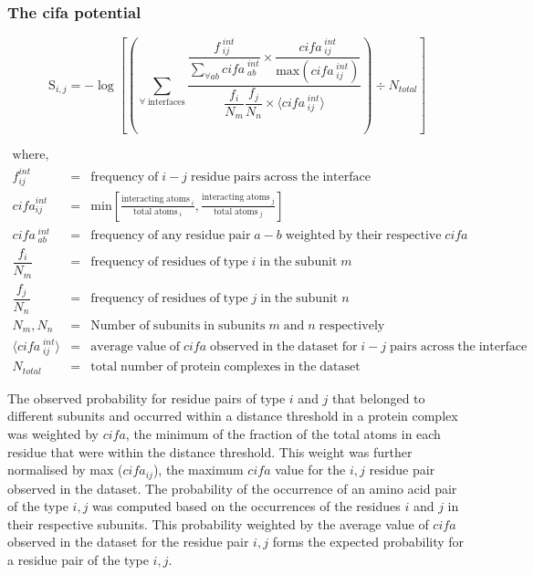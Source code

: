 \subsubsection{The cifa potential} 
\vspace{24pt}
\begingroup
\large
\begin{equation}
\mathrm{S}_{i,j} = -\log \left[ \left(\sum\limits_{\forall \;\mathrm{interfaces}} \dfrac{\dfrac{ f_{\;ij}^{\;int}}{\sum\limits_{\forall ab}{cifa}_{\;ab}^{\;int}} \times \dfrac{{cifa}_{\;ij}^{\;int}}{\mathrm{max}({cifa}_{\;ij}^{\;int})}}{\dfrac{f_i}{N_m}\dfrac{f_j}{N_n} \times \langle {cifa}_{\;ij}^{\;int} \rangle} \right) \div N_{total} \right] 
\end{equation}
\endgroup

\begingroup
\setlength\abovedisplayskip{0pt}
\begin{eqnarray}
\mathrm{where,} \nonumber \\
f_{ij}^{int} &=& \mathrm{frequency\;of}\;i-j\; \mathrm{residue\;pairs\;across\;the\;interface}
\nonumber \\
{cifa}_{ij}^{int} &=& \mathrm{min}\left[ \frac{\mathrm{interacting \; atoms}_{\;i}}{\mathrm{total \; atoms}_{\;i}}, \frac{\mathrm{interacting \; atoms}_{\;j}}{\mathrm{total \; atoms}_{\;j}}\right]
\nonumber \\
cifa_{\;ab}^{\;int} &=& \mathrm{frequency\;of\;any\;residue\;pair}\;a-b\; \mathrm{weighted\;by\;their\;respective\;}cifa
\nonumber \\
\dfrac{f_i}{N_m} &=& \mathrm{frequency\;of\;residues\;of\;type\;}i \mathrm{\;in\;the\;subunit\;}m
\nonumber \\
\dfrac{f_j}{N_n} &=& \mathrm{frequency\;of\;residues\;of\;type\;}j \mathrm{\;in\;the\;subunit\;}n
\nonumber \\
N_m, N_n &=& \mathrm{Number\;of\;subunits\;in\;subunits\;} m\; \mathrm{and\;} n\; \mathrm{respectively}
\nonumber \\
\langle {cifa}_{\;ij}^{\;int} \rangle &=& \mathrm{average\;value\;of}\;cifa\;\mathrm{observed\;in\;the\;dataset\;for}\;i-j\; \mathrm{pairs\;across\;the\;interface}
\nonumber \\
N_{total} &=& \mathrm{total\;number\;of\;protein\;complexes\;in\;the\;dataset} \nonumber
\end{eqnarray}
\endgroup

The observed probability for residue pairs of type $i$ and $j$ that belonged to different subunits and occurred within a distance threshold in a protein complex was weighted by $cifa$, the minimum of the fraction of the total atoms in each residue that were within the distance threshold. This weight was further normalised by max ($cifa_{ij}$), the maximum $cifa$ value for the $i,j$ residue pair observed in the dataset. The probability of the occurrence of an amino acid pair of the type $i, j$ was computed based on the occurrences of the residues $i$ and $j$ in their respective subunits. This probability weighted by the average value of $cifa$ observed in the dataset for the residue pair $i, j$ forms the expected probability for a residue pair of the type $i, j$.

